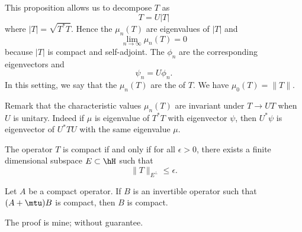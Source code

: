 This proposition allows us to decompose $T$ as
\[ 
  T=U| T |
\]
where $| T |=\sqrt{T^*T}$. Hence the $\mu_n(T)$ are eigenvalues of $| T |$ and 
\[ 
  \lim_{n\to\infty}\mu_n(T)=0
\]
because $| T |$ is compact and self-adjoint. The $\phi_n$ are the corresponding eigenvectors and
\[ 
  \psi_n=U\phi_n.
\]
 In this setting, we say that the $\mu_n(T)$ are the  of $T$. We have $\mu_0(T)=\| T \|$. 

Remark\label{pg_char_inv_U} that the characteristic values $\mu_n(T)$ are invariant under $T\to UT$ when $U$ is unitary. Indeed if $\mu$ is eigenvalue of $T^*T$ with eigenvector $\psi$, then $U^*\psi$ is eigenvector of $U^*TU$ with the same eigenvalue $\mu$.

\begin{proposition}
The operator $T$ is compact if and only if for all $\epsilon>0$, there exists a finite dimensional subspace $E\subset \hH$ such that
\[ 
  \| T \|_{E^{\perp}}\leq\epsilon.
\]
 \label{prop_comp_ini}
\end{proposition}

\begin{lemma}		\label{LemAmtuBcompaBcm}
	Let $A$ be a compact operator. If $B$ is an invertible operator such that $(A+\mtu)B$ is compact, then $B$ is compact.
\end{lemma}

\begin{probleme}
	The proof is mine; without guarantee.
\end{probleme}

